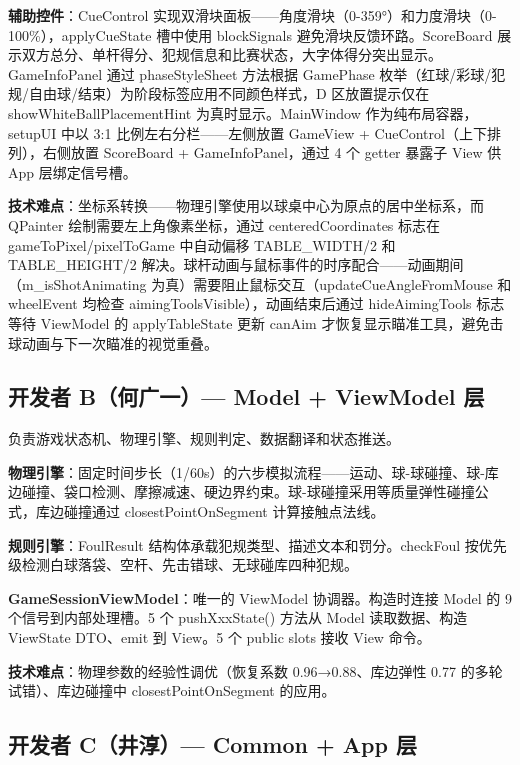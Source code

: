 \documentclass[11pt]{ctexart}
\begin{document}
\textbf{辅助控件}：CueControl 实现双滑块面板——角度滑块（0-359°）和力度滑块（0-100\%），applyCueState 槽中使用 blockSignals 避免滑块反馈环路。ScoreBoard 展示双方总分、单杆得分、犯规信息和比赛状态，大字体得分突出显示。GameInfoPanel 通过 phaseStyleSheet 方法根据 GamePhase 枚举（红球/彩球/犯规/自由球/结束）为阶段标签应用不同颜色样式，D 区放置提示仅在 showWhiteBallPlacementHint 为真时显示。MainWindow 作为纯布局容器，setupUI 中以 3:1 比例左右分栏——左侧放置 GameView + CueControl（上下排列），右侧放置 ScoreBoard + GameInfoPanel，通过 4 个 getter 暴露子 View 供 App 层绑定信号槽。

\textbf{技术难点}：坐标系转换——物理引擎使用以球桌中心为原点的居中坐标系，而 QPainter 绘制需要左上角像素坐标，通过 centeredCoordinates 标志在 gameToPixel/pixelToGame 中自动偏移 TABLE\_WIDTH/2 和 TABLE\_HEIGHT/2 解决。球杆动画与鼠标事件的时序配合——动画期间（m\_isShotAnimating 为真）需要阻止鼠标交互（updateCueAngleFromMouse 和 wheelEvent 均检查 aimingToolsVisible），动画结束后通过 hideAimingTools 标志等待 ViewModel 的 applyTableState 更新 canAim 才恢复显示瞄准工具，避免击球动画与下一次瞄准的视觉重叠。

\subsection{开发者 B（何广一）— Model + ViewModel 层}

负责游戏状态机、物理引擎、规则判定、数据翻译和状态推送。

\textbf{物理引擎}：固定时间步长（1/60s）的六步模拟流程——运动、球-球碰撞、球-库边碰撞、袋口检测、摩擦减速、硬边界约束。球-球碰撞采用等质量弹性碰撞公式，库边碰撞通过 closestPointOnSegment 计算接触点法线。

\textbf{规则引擎}：FoulResult 结构体承载犯规类型、描述文本和罚分。checkFoul 按优先级检测白球落袋、空杆、先击错球、无球碰库四种犯规。

\textbf{GameSessionViewModel}：唯一的 ViewModel 协调器。构造时连接 Model 的 9 个信号到内部处理槽。5 个 pushXxxState() 方法从 Model 读取数据、构造 ViewState DTO、emit 到 View。5 个 public slots 接收 View 命令。

\textbf{技术难点}：物理参数的经验性调优（恢复系数 0.96→0.88、库边弹性 0.77 的多轮试错）、库边碰撞中 closestPointOnSegment 的应用。

\subsection{开发者 C（井淳）— Common + App 层}
\end{document}
